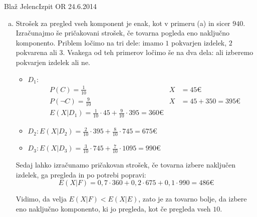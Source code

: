 \begin{naloga}{Blaž Jelenc}{Izpit OR 24.6.2014}
\begin{odgovor}
\begin{enumerate}[(a)]
\item Strošek za pregled vseh komponent je enak, kot v primeru (a) in sicer $940$. \\
Izračunajmo še pričakovani strošek, če tovarna pogleda eno naključno komponento. Priblem ločimo na tri dele: imamo $1$ pokvarjen izdelek, $2$ pokvarena ali $3$. Vsakega od teh primerov ločimo še na dva dela: ali izberemo pokvarjen izdelek ali ne.
\begin{itemize}

\item[] $D_1$: 
\begin{align*}
&P(C)  = \frac{1}{10} &X &= 45 €\\
&P(\neg C) = \frac{9}{10} & X &= 45 + 350 = 395 €\\
&E(X|D_1)= \frac{1}{10} \cdot 45 + \frac{9}{10} \cdot 395 =  360 €
\end{align*}
\item[] $D_2: E(X|D_2) = \frac{2}{10} \cdot 395 + \frac{8}{10} \cdot 745 = 675 €$
\item[] $D_3: E(X|D_3) = \frac{3}{10} \cdot 745 + \frac{7}{10} \cdot 1095 = 990 €$
\end{itemize}
Sedaj lahko izračunamo pričakovan strošek, če tovarna izbere naključen izdelek, ga pregleda in po potrebi popravi:
$$
E(X|F) = 0,7 \cdot 360 + 0,2 \cdot 675 + 0,1 \cdot 990 = 486 €
$$

Vidimo, da velja $E(X|F) < E(X|E)$, zato je za tovarno bolje, da izbere eno naključno komponento, ki jo pregleda, kot če pregleda vseh $10$.

\end{enumerate}
\end{odgovor}
\end{naloga}
